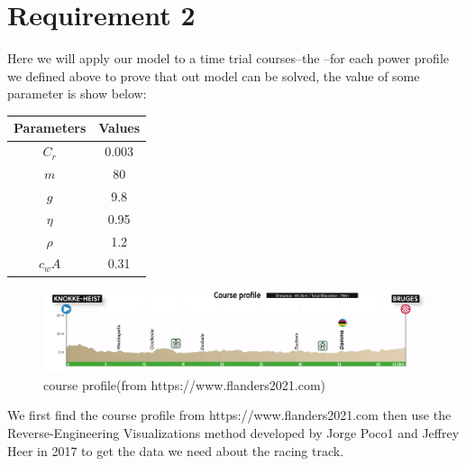 \documentclass[12pt]{article}
\begin{document}
\section{Requirement 2}
Here we will apply our model to a time trial courses--the --for each power profile we defined above to prove that out model can be solved,
the value of some parameter is show below:
\begin{tabular}{|c |c|}\hline
    \bf Parameters & \bf Values \\\hline
    $C_r$          & 0.003      \\\hline
    $m$            & 80         \\\hline
    $g$            & 9.8        \\\hline
    $\eta $        & 0.95       \\\hline
    $\rho  $       & 1.2        \\\hline
    $c_wA$         & 0.31       \\\hline
\end{tabular}
\begin{figure}
    \centering
    \includegraphics[width=1\columnwidth]{men-elite-individual-time-trial}
    \caption{course profile(from https://www.flanders2021.com)}
\end{figure}
We first find the course profile from https://www.flanders2021.com
then use the Reverse-Engineering Visualizations method developed by Jorge Poco1 and Jeffrey Heer in 2017\cite{poco2017reverse} to get the data we need about the racing track.
\end{document}
